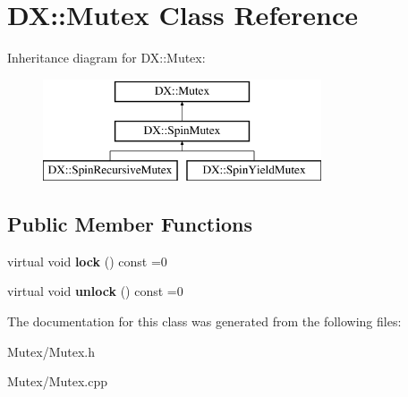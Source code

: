\hypertarget{class_d_x_1_1_mutex}{\section{D\-X\-:\-:Mutex Class Reference}
\label{class_d_x_1_1_mutex}
}
Inheritance diagram for D\-X\-:\-:Mutex\-:\begin{figure}[H]
\begin{center}
\leavevmode
\includegraphics[height=3.000000cm]{class_d_x_1_1_mutex}
\end{center}
\end{figure}
\subsection*{Public Member Functions}
\begin{DoxyCompactItemize}
\item 
\hypertarget{class_d_x_1_1_mutex_aaac9b22f8b25c59db3e22eb1573fc4bf}{virtual void {\bfseries lock} () const =0}\label{class_d_x_1_1_mutex_aaac9b22f8b25c59db3e22eb1573fc4bf}

\item 
\hypertarget{class_d_x_1_1_mutex_a3e89a059beab053e852366a810298073}{virtual void {\bfseries unlock} () const =0}\label{class_d_x_1_1_mutex_a3e89a059beab053e852366a810298073}

\end{DoxyCompactItemize}


The documentation for this class was generated from the following files\-:\begin{DoxyCompactItemize}
\item 
Mutex/Mutex.\-h\item 
Mutex/Mutex.\-cpp\end{DoxyCompactItemize}
